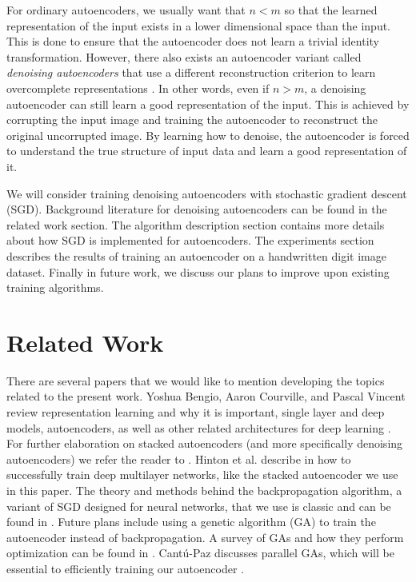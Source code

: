 \documentclass[conference]{IEEEtran}
\begin{document}
For ordinary autoencoders, we usually want that $n<m$ so that the learned representation of the input exists in a lower dimensional space than the input. This is done to ensure that the autoencoder does not learn a trivial identity transformation. However, there also exists an autoencoder variant called \textit{denoising autoencoders} that use a different reconstruction criterion to learn overcomplete representations \cite{vincent2010stacked}. In other words, even if $n>m$, a denoising autoencoder can still learn a good representation of the input. This is achieved by corrupting the input image and training the autoencoder to reconstruct the original uncorrupted image. By learning how to denoise, the autoencoder is forced to understand the true structure of input data and learn a good representation of it. 

We will consider training denoising autoencoders with stochastic gradient descent (SGD). Background literature for denoising autoencoders can be found in the related work section. The algorithm description section contains more details about how SGD is implemented for autoencoders. The experiments section describes the results of training an autoencoder on a handwritten digit image dataset. Finally in future work, we discuss our plans to improve upon existing training algorithms.

\section{Related Work}
There are several papers that we would like to mention developing the topics related to the present work. Yoshua Bengio, Aaron Courville, and Pascal Vincent review representation learning and why it is important, single layer and deep models, autoencoders, as well as other related architectures for deep learning \cite{bengio2012rep}. For further elaboration on stacked autoencoders (and more specifically denoising autoencoders) we refer the reader to \cite{vincent2010stacked}. Hinton et al. describe in \cite{hinton2006learning} how to successfully train deep multilayer networks, like the stacked autoencoder we use in this paper. The theory and methods behind the backpropagation algorithm, a variant of SGD designed for neural networks, that we use is classic and can be found in \cite{hecht1989theory,bottou-91c}. Future plans include using a genetic algorithm (GA) to train the autoencoder instead of backpropagation. A survey of GAs and how they perform optimization can be found in \cite{srinivas1994genetic}. Cant{\'u}-Paz discusses parallel GAs, which will be essential to efficiently training our autoencoder \cite{cantu1998survey}.
\end{document}
